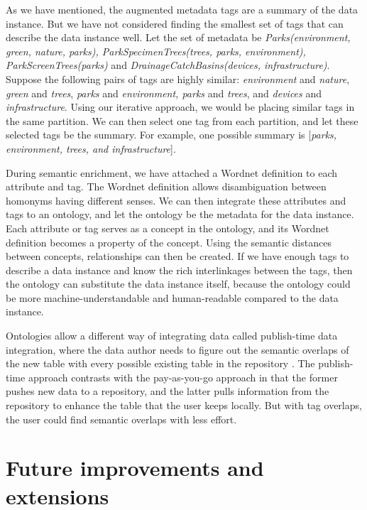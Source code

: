 As we have mentioned, the augmented metadata tags are a summary of the data instance. But we have not considered finding the smallest set of tags that can describe the data instance well. Let the set of metadata be \textit{Parks(environment, green, nature, parks), ParkSpecimenTrees(trees, parks, environment), ParkScreenTrees(parks)} and \textit{DrainageCatchBasins(devices, infrastructure)}. Suppose the following pairs of tags are highly similar: \textit{environment} and \textit{nature}, \textit{green} and \textit{trees}, \textit{parks} and \textit{environment, parks} and \textit{trees}, and \textit{devices} and \textit{infrastructure}. Using our iterative approach, we would be placing similar tags in the same partition. We can then select one tag from each partition, and let these selected tags be the summary. For example, one possible summary is [\textit{parks, environment, trees, and infrastructure}].

During semantic enrichment, we have attached a Wordnet definition to each attribute and tag. The Wordnet definition allows disambiguation between homonyms having different senses. We can then integrate these attributes and tags to an ontology, and let the ontology be the metadata for the data instance. Each attribute or tag serves as a concept in the ontology, and its Wordnet definition becomes a property of the concept. Using the semantic distances between concepts, relationships can then be created. If we have enough tags to describe a data instance and know the rich interlinkages between the tags, then the ontology can substitute the data instance itself, because the ontology could be more machine-understandable and human-readable compared to the data instance.

Ontologies allow a different way of integrating data called publish-time data integration, where the data author needs to figure out the semantic overlaps of the new table with every possible existing table in the repository \cite{Diego2018Machine}. The publish-time approach contrasts with the pay-as-you-go approach in that the former pushes new data to a repository, and the latter pulls information from the repository to enhance the table that the user keeps locally. But with tag overlaps, the user could find semantic overlaps with less effort.

\section{Future improvements and extensions}
\label{sec:FutureImprovementsAndExtensions}

